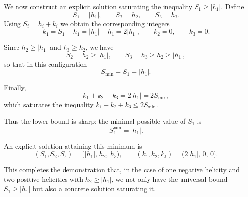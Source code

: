 \documentclass[12pt]{article}
\begin{document}
We now construct an explicit solution saturating the inequality $S_1 \ge |h_1|$.
Define
\begin{equation}
S_1 = |h_1|,\qquad
S_2 = h_2,\qquad
S_3 = h_3.
\end{equation}
Using $S_i = h_i + k_i$ we obtain the corresponding integers
\begin{equation}
k_1 = S_1 - h_1 = |h_1| - h_1 = 2|h_1|,
\qquad
k_2 = 0,
\qquad
k_3 = 0.
\end{equation}

Since $h_2 \ge |h_1|$ and $h_3 \ge h_2$, we have
\begin{equation}
S_2 = h_2 \ge |h_1|, 
\qquad
S_3 = h_3 \ge h_2 \ge |h_1|,
\end{equation}
so that in this configuration
\begin{equation}
S_{\min} = S_1 = |h_1|.
\end{equation}

Finally,
\begin{equation}
k_1 + k_2 + k_3 = 2|h_1| = 2S_{\min},
\end{equation}
which saturates the inequality $k_1 + k_2 + k_3 \le 2 S_{\min}$.

Thus the lower bound is sharp: the minimal possible value of $S_1$ is
\begin{equation}
\boxed{
S_1^{\min} = |h_1|.
}
\end{equation}

An explicit solution attaining this minimum is
\begin{equation}
(S_1,S_2,S_3) = \bigl(|h_1|,\,h_2,\,h_3\bigr),
\qquad
(k_1,k_2,k_3) = \bigl(2|h_1|,\,0,\,0\bigr).
\end{equation}

This completes the demonstration that, in the case of one negative helicity and two positive helicities with $h_2 \ge |h_1|$, we not only have the universal bound $S_1 \ge |h_1|$ but also a concrete solution saturating it.
\end{document}
